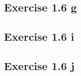 \documentclass{article}
\begin{document}
\subsection{Exercise 1.6 g}

\subsection{Exercise 1.6 i}

\subsection{Exercise 1.6 j}

\section{}

\section{}
\end{document}
